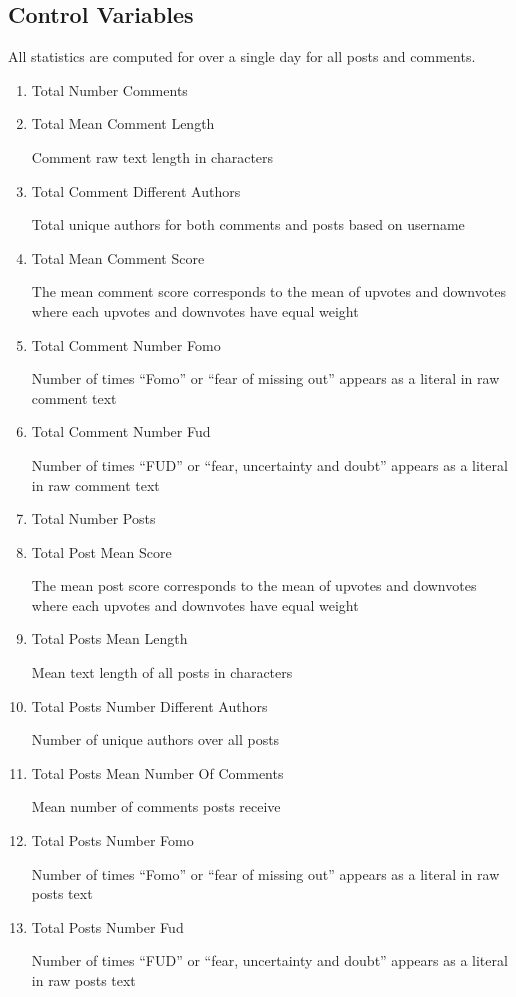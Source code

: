 \documentclass[12pt]{article}
\begin{document}
\subsection{Control Variables}

 \indent All statistics are computed for over a single day for all posts and comments.
\begin{enumerate}
\item Total Number Comments
\item Total Mean Comment Length

\indent Comment raw text length in characters

\item Total Comment Different Authors

\indent Total unique authors for both comments and posts based on username

\item Total Mean Comment Score

\indent The mean comment score corresponds to the mean of upvotes and downvotes where each upvotes and downvotes have equal weight

\item Total Comment Number Fomo

\indent Number of times ``Fomo'' or ``fear of missing out'' appears as a literal in raw comment text

\item Total Comment Number Fud

\indent Number of times ``FUD'' or ``fear, uncertainty and doubt'' appears as a literal in raw comment text

\item Total Number Posts

\item Total Post Mean Score

\indent The mean post score corresponds to the mean of upvotes and downvotes where each upvotes and downvotes have equal weight

\item Total Posts Mean Length

\indent Mean text length of all posts in characters

\item Total Posts Number Different Authors

\indent Number of unique authors over all posts
	
\item Total Posts Mean Number Of Comments

\indent Mean number of comments posts receive 

\item Total Posts Number Fomo

\indent Number of times ``Fomo'' or ``fear of missing out'' appears as a literal in raw posts text

\item Total Posts Number Fud

\indent Number of times ``FUD'' or ``fear, uncertainty and doubt'' appears as a literal in raw posts text 
\end{enumerate}
\end{document}
